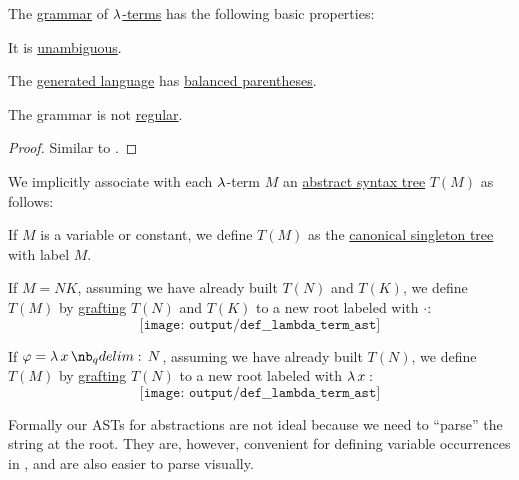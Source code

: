 \begin{proposition}\label{thm:lambda_term_grammar}
  The \hyperref[def:formal_grammar]{grammar} of \hyperref[def:lambda_term]{\( \mathrm{\lambda} \)-terms} has the following basic properties:
  \begin{thmenum}
     It is \hyperref[def:grammar_ambiguity]{unambiguous}.

     The \hyperref[def:formal_grammar/language]{generated language} has \hyperref[def:paired_delimiters]{balanced parentheses}.

     The grammar is not \hyperref[def:chomsky_hierarchy/regular]{regular}.
  \end{thmenum}
\end{proposition}
\begin{proof}
  Similar to .
\end{proof}

\begin{definition}\label{def:lambda_term_ast}\mimprovised
  We implicitly associate with each \( \mathrm{\lambda} \)-term \( M \) an \hyperref[con:abstract_syntax_tree]{abstract syntax tree} \( T(M) \) as follows:
  \begin{thmenum}
     If \( M \) is a variable or constant, we define \( T(M) \) as the \hyperref[def:canonical_singleton_tree]{canonical singleton tree} with label \( M \).

     If \( M = NK \), assuming we have already built \( T(N) \) and \( T(K) \), we define \( T(M) \) by \hyperref[def:ordered_tree_grafting_product]{grafting} \( T(N) \) and \( T(K) \) to a new root labeled with \( \cdot \):
    \begin{equation*}
      \texttt{[image: output/def\_\_lambda\_term\_ast]}
    \end{equation*}

     If \( \varphi = \qabs x N \), assuming we have already built \( T(N) \), we define \( T(M) \) by \hyperref[def:ordered_tree_grafting_product]{grafting} \( T(N) \) to a new root labeled with \( \qabs* x \):
    \begin{equation*}
      \texttt{[image: output/def\_\_lambda\_term\_ast]}
    \end{equation*}
  \end{thmenum}
\end{definition}
\begin{comments}
  \item Formally our ASTs for abstractions are not ideal because we need to \enquote{parse} the string at the root. They are, however, convenient for defining variable occurrences in , and are also easier to parse visually.
\end{comments}

